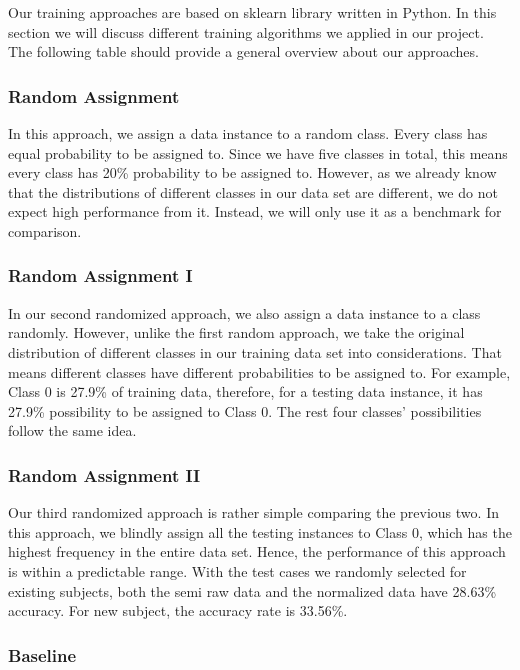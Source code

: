 \documentclass{article} %
\begin{document}
Our training approaches are based on sklearn library written in Python. In this section we will discuss different training algorithms we applied in our project. The following table should provide a general overview about our approaches.

\subsubsection{Random Assignment}

In this approach, we assign a data instance to a random class. Every class has equal probability to be assigned to. Since we have five classes in total, this means every class has 20\% probability to be assigned to. However, as we already know that the distributions of different classes in our data set are different, we do not expect high performance from it. Instead, we will only use it as a benchmark for comparison.

\subsubsection{Random Assignment I}

In our second randomized approach, we also assign a data instance to a class randomly. However, unlike the first random approach, we take the original distribution of different classes in our training data set into considerations. That means different classes have different probabilities to be assigned to. For example, Class 0 is 27.9\% of  training data, therefore, for a testing data instance, it has 27.9\% possibility to be assigned to Class 0. The rest four classes’ possibilities follow the same idea.

\subsubsection{Random Assignment II}

Our third randomized approach is rather simple comparing the previous two. In this approach, we blindly assign all the testing instances to Class 0, which has the highest frequency in the entire data set. Hence, the performance of this approach is within a predictable range. With the test cases we randomly selected for existing subjects, both the semi raw data and the normalized data have 28.63\% accuracy. For new subject, the accuracy rate is 33.56\%.

\subsubsection{Baseline}
\end{document}
